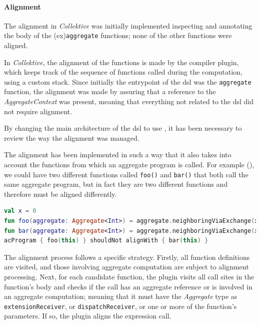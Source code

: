 \paragraph{Alignment}
\label{par:alignment}

The alignment in \emph{Collektive} was initially implemented inspecting and annotating the body of the (ex)\texttt{aggregate}
functions; none of the other functions were aligned.

In \emph{Collektive}, the alignment of the functions is made by the compiler plugin, which keeps track of the sequence of
functions called during the computation, using a custom stack.
Since initially the entrypoint of the \ac{dsl} was the \texttt{aggregate} function, the alignment was made by assuring
that a reference to the \emph{AggregateContext} was present, meaning that everything not related to the \ac{dsl} did not
require alignment.

By changing the main architecture of the \ac{dsl} to use \xc{}, it has been necessary to review the way the alignment was managed.

The alignment has been implemented in such a way that it also takes into account the functions from which an aggregate program is called.
For example (), we could have two different functions called \texttt{foo()} and \texttt{bar()} that both call the same aggregate program,
but in fact they are two different functions and therefore must be aligned differently.

\begin{lstlisting}[language=kt,label={lst:not-aligned}, caption={Example of two unaligned functions.}]
val x = 0
fun foo(aggregate: Aggregate<Int>) = aggregate.neighboringViaExchange(x)
fun bar(aggregate: Aggregate<Int>) = aggregate.neighboringViaExchange(x)
acProgram { foo(this) } shouldNot alignWith { bar(this) }
\end{lstlisting}

The alignment process follows a specific strategy.
Firstly, all function definitions are visited, and those involving aggregate computation are subject to alignment processing.
Next, for each candidate function, the plugin visits all call sites in the function's body and checks if the call has an
aggregate reference or is involved in an aggregate computation; meaning that it must have the \emph{Aggregate} type as
\texttt{extensionReceiver}, or \texttt{dispatchReceiver}, or one or more of the function's parameters.
If so, the plugin aligns the expression call.

